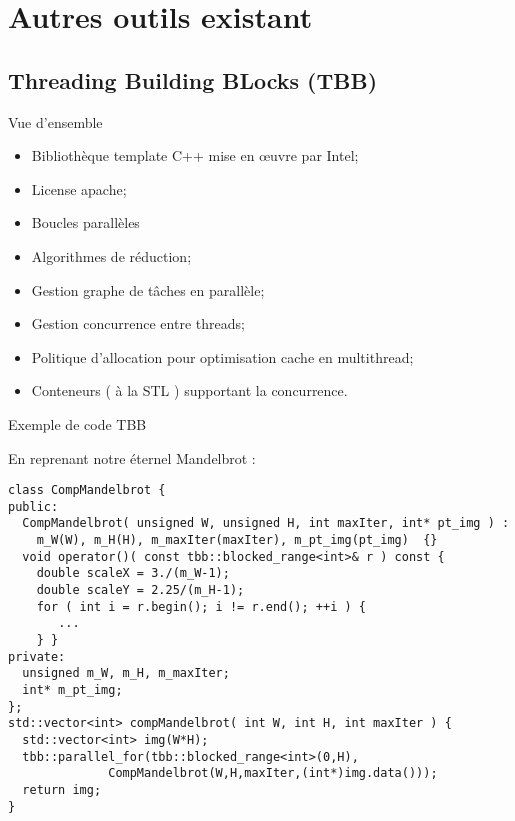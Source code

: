 \documentclass[handout,francais]{beamer}
\begin{document}
\section{Autres outils existant}

\subsection{Threading Building BLocks (TBB)}

\begin{frame}[fragile]{Vue d'ensemble}

\begin{itemize}
 \item Bibliothèque template C++ mise en {\oe}uvre par Intel;
 \item License apache;
 \item Boucles parallèles
 \item Algorithmes de réduction;
 \item Gestion graphe de tâches en parallèle;
 \item Gestion concurrence entre threads;
 \item Politique d'allocation pour optimisation cache en multithread;
 \item Conteneurs ( à la STL ) supportant la concurrence.
\end{itemize}

\end{frame}

\begin{frame}[fragile]{Exemple de code TBB}
 
 En reprenant notre éternel Mandelbrot :

\begin{lstlisting}
class CompMandelbrot {
public:
  CompMandelbrot( unsigned W, unsigned H, int maxIter, int* pt_img ) :
    m_W(W), m_H(H), m_maxIter(maxIter), m_pt_img(pt_img)  {}  
  void operator()( const tbb::blocked_range<int>& r ) const {
    double scaleX = 3./(m_W-1);
    double scaleY = 2.25/(m_H-1);
    for ( int i = r.begin(); i != r.end(); ++i ) {
       ...
    } }
private:
  unsigned m_W, m_H, m_maxIter;
  int* m_pt_img;
};
std::vector<int> compMandelbrot( int W, int H, int maxIter ) {
  std::vector<int> img(W*H);
  tbb::parallel_for(tbb::blocked_range<int>(0,H), 
              CompMandelbrot(W,H,maxIter,(int*)img.data()));
  return img;
} 
\end{lstlisting}

\end{frame}
\end{document}
